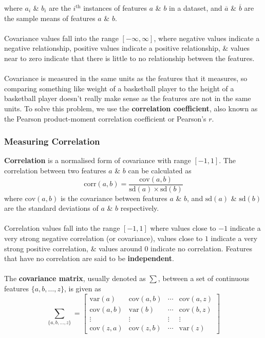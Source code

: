 \documentclass[a4paper,11pt]{article}
\begin{document}
where $a_i$ \& $b_i$ are the $i^\text{th}$ instances of features $a$ \& $b$ in a dataset, and $\overline{a}$ \& $\overline{b}$ are the sample means of features $a$ \& $b$.
\\\\
Covariance values fall into the range $[- \infty, \infty]$, where negative values indicate a negative relationship, positive values indicate a positive relationship, \& values near to zero indicate that there is little to no relationship between the features.
\\\\
Covariance is measured in the same units as the features that it measures, so comparing something like weight of a basketball player to the height of a basketball player doesn't really make sense as the features are not in the same units.
To solve this problem, we use the \textbf{correlation coefficient}, also known as the Pearson product-moment correlation coefficient or Pearson's $r$.

\subsubsection{Measuring Correlation}
\textbf{Correlation} is a normalised form of covariance with range $[-1,1]$.
The correlation between two features $a$ \& $b$ can be calculated as
\[
    \text{corr}(a,b) = \frac{\text{cov}(a,b)}{\text{sd}(a) \times \text{sd}(b)}
\]
where $\text{cov}(a,b)$ is the covariance between features $a$ \& $b$, and $\text{sd}(a)$ \& $\text{sd}(b)$ are the standard deviations of $a$ \& $b$ respectively.
\\\\
Correlation values fall into the range $[-1,1]$ where values close to $-1$ indicate a very strong negative correlation (or covariance), values close to $1$ indicate a very strong positive correlation, \& values around $0$ indicate no correlation.
Features that have no correlation are said to be \textbf{independent}.
\\\\
The \textbf{covariance matrix}, usually denoted as $\sum$, between a set of continuous features $\{a,b, \dots, z\}$, is given as
\[
    \sum_{\{ a, b, \dots, z \}} =
    \begin{bmatrix}
        \text{var}(a) & \text{cov}(a,b) & \cdots & \text{cov}(a,z) \\
        \text{cov}(a,b) & \text{var}(b) & \cdots & \text{cov}(b,z) \\
        \vdots & \vdots & \vdots & \vdots \\
        \text{cov}(z,a) & \text{cov}(z,b) & \cdots & \text{var}(z)
    \end{bmatrix}
\]
\end{document}
